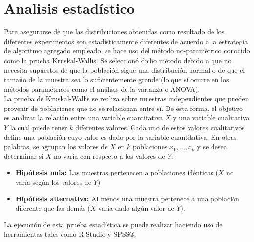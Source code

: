 \section{Analisis estadístico}
Para asegurarse de que las distribuciones obtenidas como resultado de los diferentes experimentos son estadísticamente diferentes de acuerdo a la estrategia de algoritmo agregado empleado, se hace uso del método no-paramétrico conocido como la prueba Kruskal-Wallis. Se seleccionó dicho método debido a que no necesita supuestos de que la población sigue una distribución normal o de que el tamaño de la muestra sea lo suficientemente grande (lo que sí ocurre en los métodos paramétricos como el análisis de la varianza o ANOVA).\\
La prueba de Kruskal-Wallis se realiza sobre muestras independientes que pueden provenir de poblaciones que no se relacionan entre sí. De esta forma, el objetivo es analizar la relación entre una variable cuantitativa $X$ y una variable cualitativa $Y$ la cual puede tener $k$ diferentes valores. Cada uno de estos valores cualitativos define una población cuyo valor es dado por la variable cuantitativa. En otras palabras, se agrupan los valores de $X$ en $k$ poblaciones $x_{1}, … , x_{k}$ y se desea determinar si $X$ no varía con respecto a los valores de $Y$:\\
\begin{itemize}
\item \textbf{Hipótesis nula:} Las muestras pertenecen a poblaciones idénticas ($X$ no varía según los valores de $Y$)
\item \textbf{Hipótesis alternativa:} Al menos una muestra pertenece a una población diferente que las demás ($X$ varía dado algún valor de $Y$).
\end{itemize}
La ejecución de esta prueba estadística se puede realizar haciendo uso de herramientas tales como R Studio y SPSS®.

